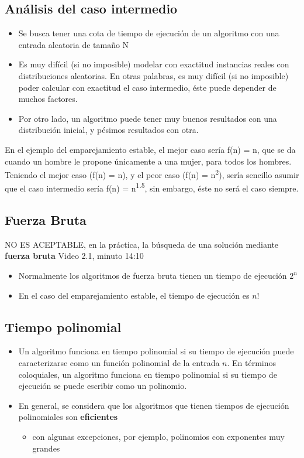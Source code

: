 \documentclass[letterpaper, 12pt]{article}
\begin{document}
\subsection{Análisis del caso intermedio}
\label{sec:org252604e}
\begin{itemize}
\item Se busca tener una cota de tiempo de ejecución de un algoritmo con una entrada
aleatoria de tamaño N
\item Es muy difícil (si no imposible) modelar con exactitud instancias reales con
distribuciones aleatorias. En otras palabras, es muy difícil (si no imposible)
poder calcular con exactitud el caso intermedio, éste puede depender de muchos
factores.
\item Por otro lado, un algoritmo puede tener muy buenos resultados con una
distribución inicial, y pésimos resultados con otra.
\end{itemize}

En el ejemplo del emparejamiento estable, el mejor caso sería f(n) = n, que se
da cuando un hombre le propone únicamente a una mujer, para todos los hombres.
Teniendo el mejor caso (f(n) = n), y el peor caso (f(n) = n\textsuperscript{2}), sería sencillo
asumir que el caso intermedio sería f(n) = n\textsuperscript{1.5}, sin embargo, éste no será el
caso siempre.
\subsection{Fuerza Bruta}
\label{sec:orga85ad89}
NO ES ACEPTABLE, en la práctica, la búsqueda de una solución mediante \textbf{fuerza
bruta}
Video 2.1, minuto 14:10
\begin{itemize}
\item Normalmente los algoritmos de fuerza bruta tienen un tiempo de ejecución \(2^n\)
\item En el caso del emparejamiento estable, el tiempo de ejecución es \(n!\)
\end{itemize}
\subsection{Tiempo polinomial}
\label{sec:org8daa3a7}
\begin{itemize}
\item Un algoritmo funciona en tiempo polinomial si su tiempo de ejecución puede
caracterizarse como un función polinomial de la entrada \(n\). En términos
coloquiales, un algoritmo funciona en tiempo polinomial si su tiempo de
ejecución se puede escribir como un polinomio.
\item En general, se considera que los algoritmos que tienen tiempos de ejecución
polinomiales son \textbf{eficientes}
\begin{itemize}
\item con algunas excepciones, por ejemplo, polinomios con exponentes muy grandes
\end{itemize}
\end{itemize}
\end{document}
